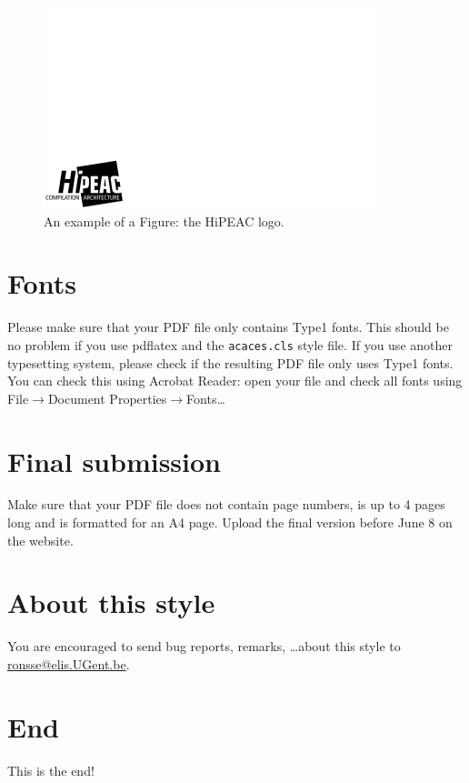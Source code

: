 \documentclass{acaces}
\begin{document}
\begin{figure}
\centering
\includegraphics{hipeac-logo-bw}
\caption{An example of a Figure: the HiPEAC logo.}
\label{logo}
\end{figure}


\section{Fonts}
Please make sure that your PDF file only contains Type1 fonts. This should be
no problem if you use pdflatex and the {\tt acaces.cls} style file. If you use
another typesetting system, please check if the resulting PDF file only uses
Type1 fonts.  You can check this using Acrobat Reader: open your file and
check all fonts using File$\rightarrow$Document Properties$\rightarrow$Fonts\ldots

\section{Final submission}
Make sure that your PDF file does not contain page numbers, is
up to 4 pages long and is formatted for an A4 page.
Upload the final version before June 8 on the website.

\section{About this style}
You are encouraged to send bug reports, remarks, \ldots about this style to
\href{mailto:ronsse@elis.UGent.be}{ronsse@elis.UGent.be}.

\section{End}
This is the end! \label{end}


\end{document}
